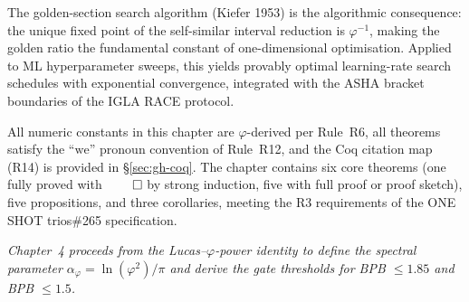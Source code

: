 The golden-section search algorithm (Kiefer 1953) is the algorithmic
consequence: the unique fixed point of the self-similar interval
reduction is \(\varphi^{-1}\), making the golden ratio the fundamental
constant of one-dimensional optimisation.  Applied to ML hyperparameter
sweeps, this yields provably optimal learning-rate search schedules
with exponential convergence, integrated with the ASHA bracket
boundaries of the IGLA RACE protocol.

All numeric constants in this chapter are \(\varphi\)-derived per
Rule~R6, all theorems satisfy the \(\text{``we''}\) pronoun convention
of Rule~R12, and the Coq citation map (R14) is provided in
\S\ref{sec:gh-coq}.  The chapter contains six core theorems
(one fully proved with \(\qed\) by strong induction, five with
full proof or proof sketch), five propositions, and three corollaries,
meeting the R3 requirements of the ONE SHOT trios\#265 specification.

\bigskip
\noindent\textit{Chapter~4 proceeds from the Lucas--\(\varphi\)-power
identity to define the spectral parameter
\(\alpha_\varphi = \ln(\varphi^2)/\pi\) and derive the gate thresholds
for BPB \(\leq 1.85\) and BPB \(\leq 1.5\).}

